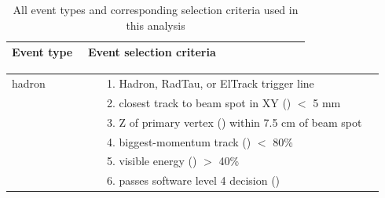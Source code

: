 \begin{table}[p]
  \caption{\label{cuts:eventtypes} All event types and corresponding
    selection criteria used in this analysis}

  \vspace{0.5 cm}
  \noindent \begin{tabular}{p{0.24\linewidth} p{0.70\linewidth}}
    Event type & Event selection criteria \\\hline
  \end{tabular}
  \vspace{-1 cm}
\end{table}

\begin{table}[p]
  \noindent \begin{tabular}{p{0.24\linewidth} p{0.70\linewidth}}
    hadron & 1. Hadron, RadTau, or ElTrack trigger line \\
    	   & 2. closest track to beam spot in XY (\dxy) $<$ 5 mm \\
    	   & 3. Z of primary vertex (\dz) within 7.5 cm of beam spot \\
    	   & 4. biggest-momentum track (\pone) $<$ 80\% \ebeam \\
    	   & 5. visible energy (\visen) $>$ 40\% \ecom \\
    	   & 6. passes software level 4 decision (\lfourdec) \\
  \end{tabular}
\end{table}

